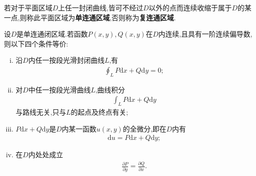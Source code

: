 \documentclass[../../main.tex]{subfiles}%
\begin{document}
\begin{definition}
若对于平面区域$D$上任一封闭曲线,皆可不经过$D$以外的点而连续收缩于属于$D$的某一点,则称此平面区域为\textbf{单连通区域},否则称为\textbf{复连通区域}.
\end{definition}

\begin{theorem}\label{theorem:数分--二重积分与路径无关定理}
设$D$是单连通闭区域.若函数$P(x,y),Q(x,y)$在$D$内连续,且具有一阶连续偏导数,则以下四个条件等价:
\begin{enumerate}[(i)]
\item 沿$D$内任一按段光滑封闭曲线$L$,有
\begin{align*}
\oint_L P\mathrm{d}x + Q\mathrm{d}y = 0;
\end{align*}

\item 对$D$中任一按段光滑曲线$L$,曲线积分
\begin{align*}
\int_L P\mathrm{d}x + Q\mathrm{d}y
\end{align*}
与路线无关,只与$L$的起点及终点有关;

\item $P\mathrm{d}x+Q\mathrm{d}y$是$D$内某一函数$u(x,y)$的全微分,即在$D$内有
\begin{align*}
\mathrm{d}u = P\mathrm{d}x + Q\mathrm{d}y;
\end{align*}

\item 在$D$内处处成立
\begin{align*}
\frac{\partial P}{\partial y} = \frac{\partial Q}{\partial x}.
\end{align*}
\end{enumerate}
\end{theorem}
\end{document}
